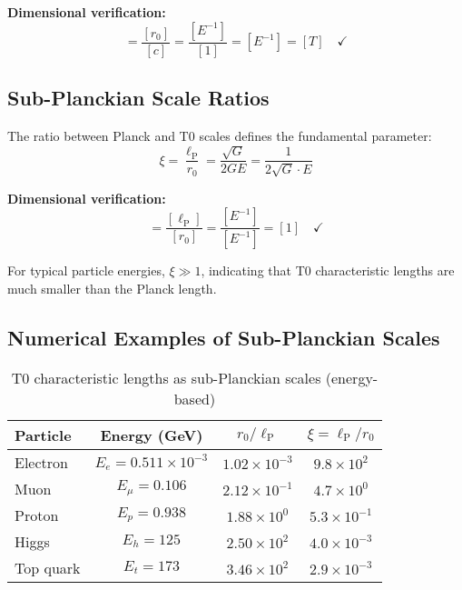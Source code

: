 \documentclass[12pt,a4paper]{report}
\newcommand{\lP}{\ell_{\text{P}}}         %
\newcommand{\rzero}{r_0}                  %
\newcommand{\tzero}{t_0}                  %
\begin{document}
\textbf{Dimensional verification:}
\begin{equation}
	[\tzero] = \frac{[\rzero]}{[c]} = \frac{[E^{-1}]}{[1]} = [E^{-1}] = [T] \quad \checkmark
\end{equation}

\subsection{Sub-Planckian Scale Ratios}
\label{subsec:sub_planckian_ratios}

The ratio between Planck and T0 scales defines the fundamental parameter:
\begin{equation}
	\xi = \frac{\lP}{\rzero} = \frac{\sqrt{G}}{2GE} = \frac{1}{2\sqrt{G} \cdot E}
\end{equation}

\textbf{Dimensional verification:}
\begin{equation}
	[\xi] = \frac{[\lP]}{[\rzero]} = \frac{[E^{-1}]}{[E^{-1}]} = [1] \quad \checkmark
\end{equation}

For typical particle energies, $\xi \gg 1$, indicating that T0 characteristic lengths are much smaller than the Planck length.

\subsection{Numerical Examples of Sub-Planckian Scales}
\label{subsec:numerical_sub_planckian}

\begin{table}[htbp]
	\centering
	\begin{tabular}{lccc}
		\toprule
		\textbf{Particle} & \textbf{Energy (GeV)} & \textbf{$\rzero/\lP$} & \textbf{$\xi = \lP/\rzero$} \\
		\midrule
		Electron & $E_e = 0.511 \times 10^{-3}$ & $1.02 \times 10^{-3}$ & $9.8 \times 10^{2}$ \\
		Muon & $E_\mu = 0.106$ & $2.12 \times 10^{-1}$ & $4.7 \times 10^{0}$ \\
		Proton & $E_p = 0.938$ & $1.88 \times 10^{0}$ & $5.3 \times 10^{-1}$ \\
		Higgs & $E_h = 125$ & $2.50 \times 10^{2}$ & $4.0 \times 10^{-3}$ \\
		Top quark & $E_t = 173$ & $3.46 \times 10^{2}$ & $2.9 \times 10^{-3}$ \\
		\bottomrule
	\end{tabular}
	\caption{T0 characteristic lengths as sub-Planckian scales (energy-based)}
	\label{tab:sub_planckian_scales}
\end{table}
\end{document}
